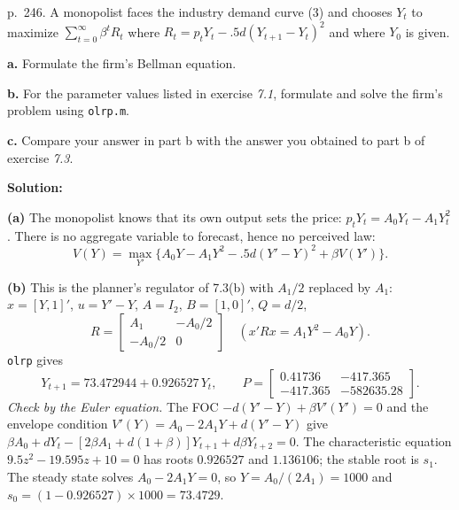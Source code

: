 \documentclass[12pt, letterpaper]{article}
\begin{document}
\begin{tcolorbox}[evenbox,title={Exercise 7.4 \quad Monopoly}]
\begin{tcolorbox}[questionbox]
p.~246. A monopolist faces the industry demand curve (3) and chooses $Y_t$ to maximize
$\sum_{t=0}^\infty\beta^tR_t$ where $R_t=p_tY_t-.5d(Y_{t+1}-Y_t)^2$ and where $Y_0$ is given.

\textbf{a.} Formulate the firm's Bellman equation.

\textbf{b.} For the parameter values listed in exercise \textit{7.1}, formulate and solve the firm's
problem using \texttt{olrp.m}.

\textbf{c.} Compare your answer in part b with the answer you obtained to part b of exercise
\textit{7.3}.
\end{tcolorbox}

\textbf{Solution:}

\textbf{(a)} The monopolist knows that its own output sets the price: $p_tY_t=A_0Y_t-A_1Y_t^2$.
There is no aggregate variable to forecast, hence no perceived law:
\[
\boxed{V(Y)=\max_{Y'}\Big\{A_0Y-A_1Y^2-.5d(Y'-Y)^2+\beta V(Y')\Big\}.}
\]

\textbf{(b)} This is the planner's regulator of 7.3(b) with $A_1/2$ replaced by $A_1$:
$x=[Y,1]'$, $u=Y'-Y$, $A=I_2$, $B=[1,0]'$, $Q=d/2$,
\[
R=\begin{bmatrix}A_1&-A_0/2\\-A_0/2&0\end{bmatrix}\quad(x'Rx=A_1Y^2-A_0Y).
\]
\texttt{olrp} gives
\[
\boxed{Y_{t+1}=73.472944+0.926527\,Y_t,}\qquad
P=\begin{bmatrix}0.41736&-417.365\\-417.365&-582635.28\end{bmatrix}.
\]
\emph{Check by the Euler equation.} The FOC $-d(Y'-Y)+\beta V'(Y')=0$ and the envelope condition
$V'(Y)=A_0-2A_1Y+d(Y'-Y)$ give
$\beta A_0+dY_t-[2\beta A_1+d(1+\beta)]Y_{t+1}+d\beta Y_{t+2}=0$. The characteristic equation
$9.5z^2-19.595z+10=0$ has roots $0.926527$ and $1.136106$; the stable root is $s_1$. The steady state
solves $A_0-2A_1Y=0$, so $Y=A_0/(2A_1)=1000$ and $s_0=(1-0.926527)\times1000=73.4729$. \checkmark


\end{tcolorbox}
\end{document}
